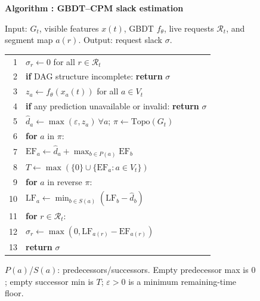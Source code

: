 \begin{figure}[t]
  \raggedright
  \label{alg:slack-estimation}
  \noindent\textbf{Algorithm \thedesignalgorithm: GBDT--CPM slack estimation}
  \par\smallskip
  \noindent Input: $G_t$, visible features $x(t)$, GBDT $f_\theta$, live
  requests $\mathcal R_t$, and segment map $a(r)$.
  Output: request slack $\sigma$.
  \par\smallskip
  \begin{tabularx}{\columnwidth}{@{}r@{\quad}X@{}}
    \toprule
     1 & $\sigma_r\gets0$ for all $r\in\mathcal R_t$ \\
     2 & \textbf{if} DAG structure incomplete: \textbf{return} $\sigma$ \\
     3 & $z_a\gets f_\theta(x_a(t))$ for all $a\in V_t$ \\
     4 & \textbf{if} any prediction unavailable or invalid: \textbf{return} $\sigma$ \\
     5 & $\widehat d_a\gets\max(\varepsilon,z_a)\ \forall a$; $\pi\gets\mathrm{Topo}(G_t)$ \\
     6 & \textbf{for} $a$ in $\pi$: \\
     7 & \quad $\mathrm{EF}_a\gets\widehat d_a+\max_{b\in P(a)}\mathrm{EF}_b$ \\
     8 & $T\gets\max(\{0\}\cup\{\mathrm{EF}_a:a\in V_t\})$ \\
     9 & \textbf{for} $a$ in reverse $\pi$: \\
    10 & \quad $\mathrm{LF}_a\gets\min_{b\in S(a)}(\mathrm{LF}_b-\widehat d_b)$ \\
    11 & \textbf{for} $r\in\mathcal R_t$: \\
    12 & \quad $\sigma_r\gets\max(0,\mathrm{LF}_{a(r)}-\mathrm{EF}_{a(r)})$ \\
    13 & \textbf{return} $\sigma$ \\
    \bottomrule
  \end{tabularx}
  \par\smallskip
  \noindent $P(a)$/$S(a)$: predecessors/successors. Empty predecessor
  max is $0$; empty successor min is $T$; $\varepsilon>0$ is a
  minimum remaining-time floor.
\end{figure}

